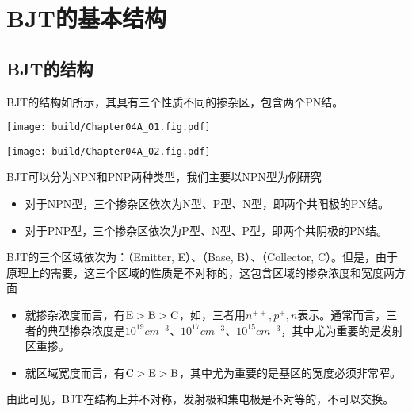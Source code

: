 \section{BJT的基本结构}

\subsection{BJT的结构}

BJT的结构如所示，其具有三个性质不同的掺杂区，包含两个PN结。



\begin{Figure}[BJT的结构简图]
    \begin{FigureSub}[NPN的结构简图]
        \texttt{[image: build/Chapter04A\_01.fig.pdf]}
    \end{FigureSub}
    \hspace{0.2cm}
    \begin{FigureSub}[PNP的结构简图]
        \texttt{[image: build/Chapter04A\_02.fig.pdf]}
    \end{FigureSub}
\end{Figure}

BJT可以分为NPN和PNP两种类型，我们主要以NPN型为例研究

\begin{itemize}
    \item 对于NPN型，三个掺杂区依次为N型、P型、N型，即两个共阳极的PN结。
    \item 对于PNP\hspace{0.4em}型，三个掺杂区依次为P型、N型、P型，\hspace{0.1em}即两个共阴极的PN结。
\end{itemize}

BJT的三个区域依次为：（Emitter, E）、（Base, B）、（Collector, C）。但是，由于原理上的需要，这三个区域的性质是不对称的，这包含区域的掺杂浓度和宽度两方面
\begin{itemize}
    \item 就掺杂浓度而言，有$\text{E}>\text{B}>\text{C}$，如，三者用$n^{++}, p^{+},n$表示。通常而言，三者的典型掺杂浓度是$\si{10^{19} cm^{-3}}$、$\si{10^{17} cm^{-3}}$、$\si{10^{15} cm^{-3}}$，其中尤为重要的是发射区重掺。
    \item 就区域宽度而言，有$\text{C}>\text{E}>\text{B}$，其中尤为重要的是基区的宽度必须非常窄。
\end{itemize}
由此可见，BJT在结构上并不对称，发射极和集电极是不对等的，不可以交换。

